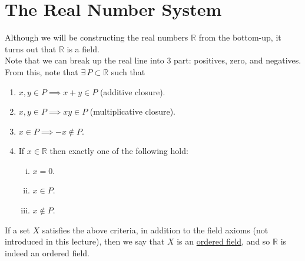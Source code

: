 \documentclass[12pt]{article}
\newlength\tindent
\renewcommand{\indent}{\hspace*{\tindent}}
\newcommand{\R}{\mathbb R}
\begin{document}
\section{The Real Number System}

\indent Although we will be constructing the real numbers $\R$ from the bottom-up, it turns out that $\R$ is a field. \\


\indent Note that we can break up the real line into 3 part: positives, zero, and negatives. From this, note that $\exists\,P \subset \R$ such that
\begin{enumerate}[(1)]
	\item $x, y \in P \implies x + y \in P$ (additive closure).
	\item $x, y \in P \implies xy \in P$ (multiplicative closure).
	\item $x \in P \implies -x \notin P$.
	\item If $x \in \R$ then exactly one of the following hold:
	\begin{enumerate}[(i)]
		\item $x = 0$.
		\item $x \in P$.
		\item $x \notin P$.
	\end{enumerate}
\end{enumerate}

\indent If a set $X$ satisfies the above criteria, in addition to the field axioms (not introduced in this lecture), then we say that $X$ is an \underline{ordered field}, and so $\R$ is indeed an ordered field.
\end{document}
